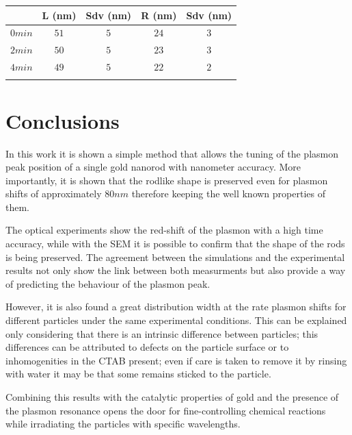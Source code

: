 \documentclass[twocolumn]{article}
\begin{document}
\begin{tabular*}{0.48\textwidth}{c c c c c}
 $\,$ & L (nm) & Sdv (nm) & R (nm) & Sdv (nm) \\\hline
 $0min$ & $51$ & $5$ & $24$ & $3$ \\ 
 $2min$ & $50$ & $5$ & $23$ & $3$ \\
 $4min$ & $49$ & $5$ & $22$ & $2$ \\
\label{tab:SEM_results}

\end{tabular*}


\section{Conclusions}
In this work it is shown a simple method that allows the tuning of the plasmon
peak position of a single gold nanorod with nanometer accuracy. More
importantly, it is shown that the rodlike shape is preserved even for plasmon
shifts of approximately $80nm$ therefore keeping the well known properties of
them.

The optical experiments show the red-shift of the plasmon with a high time
accuracy, while with the SEM it is possible to confirm that the shape of the
rods is being preserved. The agreement between the simulations and the
experimental results not only show the link between both measurments but also
provide a way of predicting the behaviour of the plasmon peak. 

However, it is also found a great distribution width at the rate plasmon shifts
for different particles under the same experimental conditions. This can be
explained only considering that there is an intrinsic difference between
particles; this differences can be attributed to defects on the particle surface
or to inhomogenities in the CTAB present; even if care is taken to remove it
by rinsing with water it may be that some remains sticked to the particle.

Combining this results with the catalytic properties of gold and the presence of
the plasmon resonance opens the door for fine-controlling chemical reactions
while irradiating the particles with specific wavelengths.

{}

\end{document}
